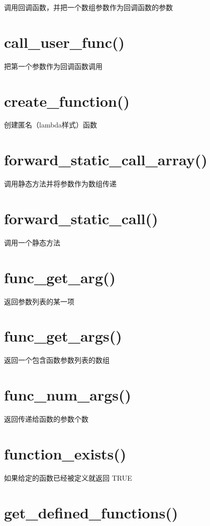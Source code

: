 调用回调函数，并把一个数组参数作为回调函数的参数


\section{call\_user\_func()}

把第一个参数作为回调函数调用


\section{create\_function()}

创建匿名（lambda样式）函数


\section{forward\_static\_call\_array()}

调用静态方法并将参数作为数组传递


\section{forward\_static\_call()}

调用一个静态方法

\section{func\_get\_arg()}

返回参数列表的某一项

\section{func\_get\_args()}

返回一个包含函数参数列表的数组


\section{func\_num\_args()}

返回传递给函数的参数个数

\section{function\_exists()}

如果给定的函数已经被定义就返回 TRUE


\section{get\_defined\_functions()}

